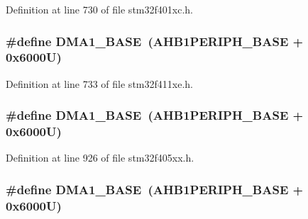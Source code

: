 Definition at line 730 of file stm32f401xc.\+h.

\subsubsection[{\texorpdfstring{D\+M\+A1\+\_\+\+B\+A\+SE}{DMA1_BASE}}]{\setlength{\rightskip}{0pt plus 5cm}\#define D\+M\+A1\+\_\+\+B\+A\+SE~({\bf A\+H\+B1\+P\+E\+R\+I\+P\+H\+\_\+\+B\+A\+SE} + 0x6000\+U)}\hypertarget{group___peripheral__registers__structures_gab2d8a917a0e4ea99a22ac6ebf279bc72}{}\label{group___peripheral__registers__structures_gab2d8a917a0e4ea99a22ac6ebf279bc72}


Definition at line 733 of file stm32f411xe.\+h.

\subsubsection[{\texorpdfstring{D\+M\+A1\+\_\+\+B\+A\+SE}{DMA1_BASE}}]{\setlength{\rightskip}{0pt plus 5cm}\#define D\+M\+A1\+\_\+\+B\+A\+SE~({\bf A\+H\+B1\+P\+E\+R\+I\+P\+H\+\_\+\+B\+A\+SE} + 0x6000\+U)}\hypertarget{group___peripheral__registers__structures_gab2d8a917a0e4ea99a22ac6ebf279bc72}{}\label{group___peripheral__registers__structures_gab2d8a917a0e4ea99a22ac6ebf279bc72}


Definition at line 926 of file stm32f405xx.\+h.

\subsubsection[{\texorpdfstring{D\+M\+A1\+\_\+\+B\+A\+SE}{DMA1_BASE}}]{\setlength{\rightskip}{0pt plus 5cm}\#define D\+M\+A1\+\_\+\+B\+A\+SE~({\bf A\+H\+B1\+P\+E\+R\+I\+P\+H\+\_\+\+B\+A\+SE} + 0x6000\+U)}\hypertarget{group___peripheral__registers__structures_gab2d8a917a0e4ea99a22ac6ebf279bc72}{}\label{group___peripheral__registers__structures_gab2d8a917a0e4ea99a22ac6ebf279bc72}


